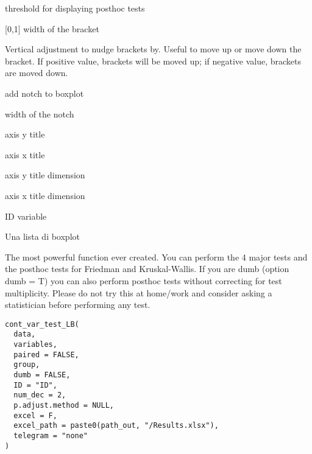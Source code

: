 \documentclass[a4paper]{book}
\begin{document}
\begin{Arguments}
\begin{ldescription}
\item[\code{threshold\_posthoc}] threshold for displaying posthoc tests

\item[\code{bracket\_shorten}] [0,1] width of the bracket

\item[\code{bracket.nudge.y}] Vertical adjustment to nudge brackets by. Useful to move up or move down the bracket. If positive value, brackets will be moved up; if negative value, brackets are moved down.

\item[\code{notch}] add notch to boxplot

\item[\code{notchwidth}] width of the notch

\item[\code{axis\_y\_title}] axis y title

\item[\code{axis\_x\_title}] axis x title

\item[\code{size\_axis\_x}] axis y title dimension

\item[\code{size\_axis\_y}] axis x title dimension

\item[\code{ID}] ID variable
\end{ldescription}
\end{Arguments}
%
\begin{Value}
Una lista di boxplot
\end{Value}
%
\begin{Description}
The most powerful function ever created. You can perform the 4 major tests and the posthoc tests for Friedman and Kruskal-Wallis.
If you are dumb (option dumb = T) you can also perform posthoc tests without correcting for test multiplicity.
Please do not try this at home/work and consider asking a statistician before performing any test.
\end{Description}
%
\begin{Usage}
\begin{verbatim}
cont_var_test_LB(
  data,
  variables,
  paired = FALSE,
  group,
  dumb = FALSE,
  ID = "ID",
  num_dec = 2,
  p.adjust.method = NULL,
  excel = F,
  excel_path = paste0(path_out, "/Results.xlsx"),
  telegram = "none"
)
\end{verbatim}
\end{Usage}
\end{document}
